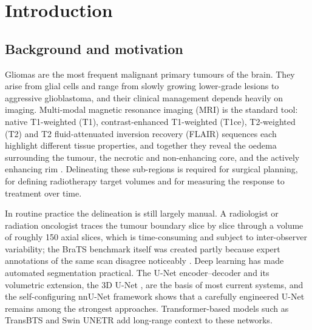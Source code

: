 \chapter{Introduction}
\section{Background and motivation}
Gliomas are the most frequent malignant primary tumours of the brain. They arise from glial cells and range from slowly growing lower-grade lesions to aggressive glioblastoma, and their clinical management depends heavily on imaging. Multi-modal magnetic resonance imaging (MRI) is the standard tool: native T1-weighted (T1), contrast-enhanced T1-weighted (T1ce), T2-weighted (T2) and T2 fluid-attenuated inversion recovery (FLAIR) sequences each highlight different tissue properties, and together they reveal the oedema surrounding the tumour, the necrotic and non-enhancing core, and the actively enhancing rim \cite{menze2015,bakas2017}. Delineating these sub-regions is required for surgical planning, for defining radiotherapy target volumes and for measuring the response to treatment over time.

In routine practice the delineation is still largely manual. A radiologist or radiation oncologist traces the tumour boundary slice by slice through a volume of roughly 150 axial slices, which is time-consuming and subject to inter-observer variability; the BraTS benchmark itself was created partly because expert annotations of the same scan disagree noticeably \cite{menze2015}. Deep learning has made automated segmentation practical. The U-Net encoder--decoder \cite{ronneberger2015} and its volumetric extension, the 3D U-Net \cite{cicek2016}, are the basis of most current systems, and the self-configuring nnU-Net framework \cite{isensee2021} shows that a carefully engineered U-Net remains among the strongest approaches. Transformer-based models such as TransBTS \cite{wang2021transbts} and Swin UNETR \cite{hatamizadeh2022swin} add long-range context to these networks.

